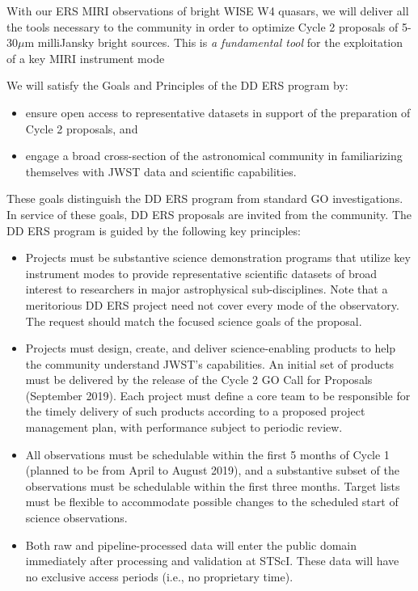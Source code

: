 With our ERS MIRI observations of bright WISE W4 quasars, we will deliver all the tools necessary to the community in order to optimize Cycle 2 proposals of 5-30$\mu$m milliJansky bright sources. This is {\it a fundamental tool} for the exploitation of a key MIRI instrument mode

We will satisfy the Goals and Principles of the DD ERS program by:
\begin{itemize}
\item ensure open access to representative datasets in support of the preparation of Cycle 2 proposals, and
\item engage a broad cross-section of the astronomical community in familiarizing themselves with JWST data and scientific capabilities.
\end{itemize}


These goals distinguish the DD ERS program from standard GO investigations. In service of these goals, DD ERS proposals are invited from the community.
The DD ERS program is guided by the following key principles:

\begin{itemize}
\item Projects must be substantive science demonstration programs that utilize key instrument modes to provide representative scientific datasets of broad interest to researchers in major astrophysical sub-disciplines. Note that a meritorious DD ERS project need not cover every mode of the observatory. The request should match the focused science goals of the proposal.

\item Projects must design, create, and deliver science-enabling products to help the community understand JWST's capabilities.  An initial set of products must be delivered by the release of the Cycle 2 GO Call for Proposals (September 2019).  Each project must define a core team to be responsible for the timely delivery of such products according to a proposed project management plan, with performance subject to periodic review.

\item All observations must be schedulable within the first 5 months of Cycle 1 (planned to be from April to August 2019), and a substantive subset of the observations must be schedulable within the first three months.   Target lists must be flexible to accommodate possible changes to the scheduled start of science observations.

\item Both raw and pipeline-processed data will enter the public domain immediately after processing and validation at STScI. These data will have no exclusive access periods (i.e., no proprietary time).
\end{itemize}

